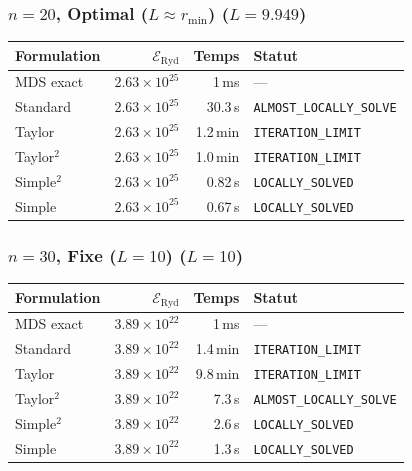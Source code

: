 \subsubsection{$n=20$, Optimal ($L{\approx}r_{\min}$) ($L=9.949$)}
\begin{longtable}{@{}lrrl@{}}
  \toprule
  Formulation & $\mathcal{E}_{\mathrm{Ryd}}$ & Temps & Statut \\
  \midrule
  \endhead
  MDS exact & $2.63\times10^{25}$ & 1\,ms & --- \\
  Standard & $2.63\times10^{25}$ & 30.3\,s & \texttt{ALMOST\_LOCALLY\_SOLVE} \\
  Taylor & $2.63\times10^{25}$ & 1.2\,min & \texttt{ITERATION\_LIMIT} \\
  Taylor$^2$ & $2.63\times10^{25}$ & 1.0\,min & \texttt{ITERATION\_LIMIT} \\
  Simple$^2$ & $2.63\times10^{25}$ & 0.82\,s & \texttt{LOCALLY\_SOLVED} \\
  Simple & $2.63\times10^{25}$ & 0.67\,s & \texttt{LOCALLY\_SOLVED} \\
  \bottomrule
\end{longtable}

\subsubsection{$n=30$, Fixe ($L{=}10$) ($L=10$)}
\begin{longtable}{@{}lrrl@{}}
  \toprule
  Formulation & $\mathcal{E}_{\mathrm{Ryd}}$ & Temps & Statut \\
  \midrule
  \endhead
  MDS exact & $3.89\times10^{22}$ & 1\,ms & --- \\
  Standard & $3.89\times10^{22}$ & 1.4\,min & \texttt{ITERATION\_LIMIT} \\
  Taylor & $3.89\times10^{22}$ & 9.8\,min & \texttt{ITERATION\_LIMIT} \\
  Taylor$^2$ & $3.89\times10^{22}$ & 7.3\,s & \texttt{ALMOST\_LOCALLY\_SOLVE} \\
  Simple$^2$ & $3.89\times10^{22}$ & 2.6\,s & \texttt{LOCALLY\_SOLVED} \\
  Simple & $3.89\times10^{22}$ & 1.3\,s & \texttt{LOCALLY\_SOLVED} \\
  \bottomrule
\end{longtable}

